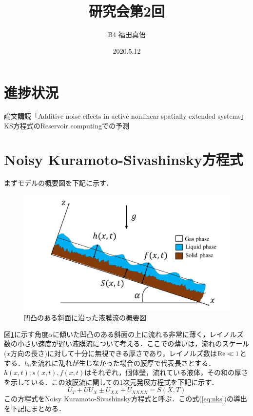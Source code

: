 \documentclass[autodetect-engine,dvipdfmx-if-dvi,ja=standard,a4paper,11pt]{bxjsarticle} %
\title{研究会第2回} %
\author{B4 福田真悟} %
\date{2020.5.12}%
\begin{document}
\maketitle %
\section{進捗状況}%
論文講読「Additive noise effects in active nonlinear spatially extended systems」\cite{all}\\
\　KS方程式のReservoir computingでの予測

\section{Noisy Kuramoto-Sivashinsky方程式}
まずモデルの概要図を下記に示す．
\begin{figure}[H]%
\begin{center}
\includegraphics[width=.6\textwidth]{aboutNew.jpg} 
\end{center}
\caption{凹凸のある斜面に沿った液膜流の概要図}%
\label{fig:about}%
\end{figure}
図\ref{fig:about}に示す角度$\alpha$に傾いた凹凸のある斜面の上に流れる非常に薄く，レイノルズ数の小さい速度が遅い液膜流について考える．ここでの薄いは，流れのスケール($x$方向の長さ)に対して十分に無視できる厚さであり，レイノルズ数は${\rm Re}\ll1$とする．$h_0$を流れに乱れが生じなかった場合の膜厚で代表長さとする．$h(x,t),s(x,t),f(x,t)$はそれぞれ，個体壁，流れている液体，その和の厚さを示している．この液膜流に関しての1次元発展方程式を下記に示す．
\begin{equation}
U_T+UU_X\pm{U_{XX}}+U_{XXXX}=S(X,T)
\label{eq:nks}
\end{equation}
この方程式をNoisy Kuramoto-Sivashinsky方程式と呼ぶ．この式(\ref{eq:nks})の導出を下記にまとめる．
\end{document}
